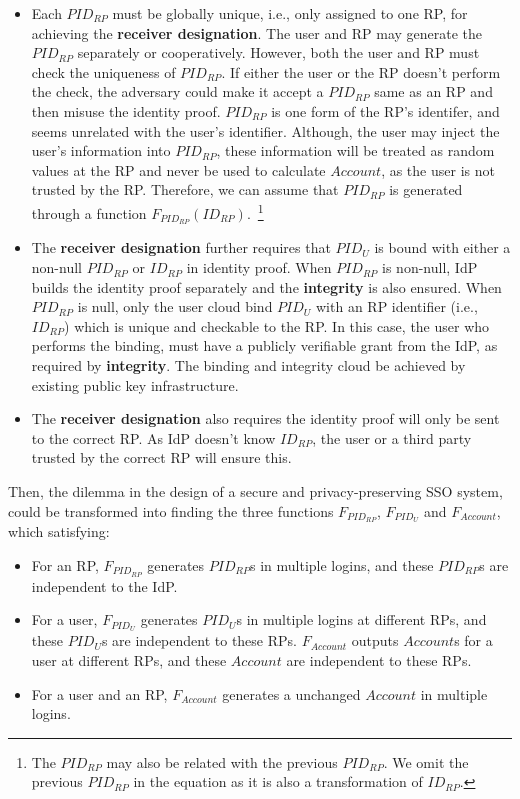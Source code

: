\begin{itemize}
  \item %
  Each $PID_{RP}$ must be globally unique, i.e., only assigned to one RP,  for achieving the \textbf{receiver designation}.
        The user and RP may generate the $PID_{RP}$ separately or cooperatively.
        However, both the user and RP must check the uniqueness of $PID_{RP}$.
        If either the user or the RP doesn't perform the check, the adversary could make it accept a $PID_{RP}$ same as an RP and then misuse the identity proof.
        $PID_{RP}$ is one form of the RP's identifer, and seems unrelated with the user's identifier.
        Although, the user may inject the user's information into $PID_{RP}$, these information will be treated as random values at the RP and never be used to calculate $Account$, as the user is not trusted by the RP.
        Therefore, we can assume that $PID_{RP}$ is generated through a function $F_{PID_{RP}}(ID_{RP})$.~\footnote{The $PID_{RP}$ may also be related with the previous $PID_{RP}$. We omit the previous $PID_{RP}$ in the equation as it is also a transformation of $ID_{RP}$.}
  \item The \textbf{receiver designation} further requires that  $PID_{U}$ is bound with either a non-null $PID_{RP}$ or $ID_{RP}$ in identity proof.
        When $PID_{RP}$  is non-null, IdP builds the identity proof separately and the \textbf{integrity} is also ensured.
        When $PID_{RP}$  is null, only the user cloud bind $PID_{U}$ with an RP identifier (i.e., $ID_{RP}$) which is unique and checkable to the RP.
        In this case, the user who performs the binding, must have a publicly verifiable grant from the IdP, as required by \textbf{integrity}.
        The binding and integrity cloud be achieved by existing public key infrastructure.
   \item The \textbf{receiver designation} also requires the identity proof will only be sent to the correct RP.
       As IdP doesn't know $ID_{RP}$, the user or a third party trusted by the correct RP will ensure this.
\end{itemize}

Then, the dilemma in the design of a secure and privacy-preserving SSO system, could be transformed into finding the three functions  $F_{PID_{RP}}$,  $F_{PID_{U}}$ and $F_{Account}$, which satisfying:
\begin{itemize}
  \item For an RP, $F_{PID_{RP}}$ generates $PID_{RP}$s in multiple logins, and these  $PID_{RP}$s are independent to the IdP.
  \item For a user, $F_{PID_{U}}$ generates $PID_{U}$s in multiple logins at different RPs, and these $PID_{U}$s are independent to these RPs. $F_{Account}$ outputs $Account$s for a user at different RPs, and these $Account$ are independent to these RPs.
  \item For a user and an RP, $F_{Account}$ generates a unchanged $Account$ in multiple logins.
\end{itemize}


